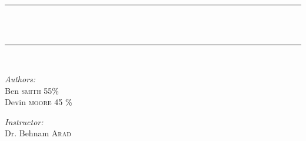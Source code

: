 \begin{titlepage}
	\begin{center}
		\vspace{20 cm}
		
		\textsc{\Large \COURSE}\\[1.3cm]
		\textsc{\Large \DUEDATE}\\[0.5cm]

		\vspace{5 mm}
		
		\rule{415pt}{2pt}\\
		{ \Huge \bfseries \TITLE \\[0.2cm] }
		\rule{415pt}{2pt}\\
		
		\vspace{10mm}
		
		\begin{minipage}{0.4\textwidth}
		\begin{flushleft} \Large
		
		\emph{Authors:}\\
			Ben	  	\textsc{smith} 55\% \\
			Devin	\textsc{moore} 45 \%
		\end{flushleft}
		\end{minipage}
		\begin{minipage}{0.4\textwidth}
		\begin{flushright} \Large
		
		\emph{Instructor:} \\
			Dr. Behnam 	\textsc{Arad}
		\end{flushright}
		\end{minipage}
	\end{center}
	
	\vspace{25mm}
	
	\begin{center}
	\begin{minipage}{470pt}
		\begin{flushleft} \Large
			
		\end{flushleft}
		
		\begin{flushleft} \Large
		\end{flushleft}
	\end{minipage}
	\end{center}
	\vfill
		

\end{titlepage}
